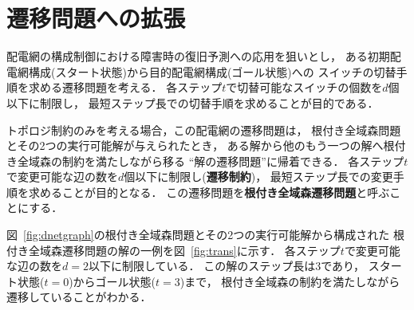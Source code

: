 ﻿\section{遷移問題への拡張}\label{chap:trans}






配電網の構成制御における障害時の復旧予測への応用を狙いとし，
ある初期配電網構成(スタート状態)から目的配電網構成(ゴール状態)への
スイッチの切替手順を求める遷移問題を考える．
各ステップ$t$で切替可能なスイッチの個数を$d$個以下に制限し，
最短ステップ長での切替手順を求めることが目的である．

トポロジ制約のみを考える場合，この配電網の遷移問題は，
根付き全域森問題とその2つの実行可能解が与えられたとき，
ある解から他のもう一つの解へ根付き全域森の制約を満たしながら移る
``解の遷移問題''に帰着できる．
各ステップ$t$で変更可能な辺の数を$d$個以下に制限し(\textbf{遷移制約})，
最短ステップ長での変更手順を求めることが目的となる．
この遷移問題を\textbf{根付き全域森遷移問題}と呼ぶことにする．

図~\ref{fig:dnetgraph}の根付き全域森問題とその2つの実行可能解から構成された
根付き全域森遷移問題の解の一例を図~\ref{fig:trans}に示す．
各ステップ$t$で変更可能な辺の数を$d=2$以下に制限している．
この解のステップ長は3であり，
スタート状態($t=0$)からゴール状態($t=3$)まで，
根付き全域森の制約を満たしながら遷移していることがわかる．


